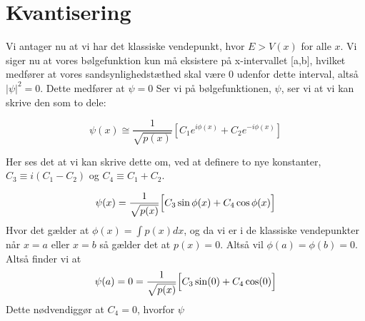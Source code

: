 \section{Kvantisering}
Vi antager nu at vi har det klassiske vendepunkt, hvor $E > V(x) $ for alle $ x$. Vi siger nu at vores bølgefunktion kun må eksistere på x-intervallet [a,b], hvilket medfører at vores sandsynlighedstæthed skal være 0 udenfor dette interval, altså $|\psi|^2 = 0$. Dette medfører at $\psi = 0$
Ser vi på bølgefunktionen, $\psi$, ser vi at vi kan skrive den som to dele:

\begin{equation}
  \psi(x) \cong \frac{1}{\sqrt{p(x)}}\left[C_1e^{i\phi(x)}+C_2e^{-i\phi(x)}\right]
  \label{eq:kvantiseringStart}
\end{equation}

Her ses det at vi kan skrive dette om, ved at definere to nye konstanter, $C_3 \equiv i(C_1-C_2)$ og $C_4 \equiv C_1+C_2$.

\begin{equation}
  \psi(x) = \frac{1}{\sqrt{p(x)}}
  \Bigl[    C_3\sin{\phi(x)}+C_4\cos{\phi(x)}   \Bigr]
  \label{eq:kvantiseringSinCos}
\end{equation}
Hvor det gælder at $\phi(x) = \int p(x) dx$, og da vi er i de klassiske vendepunkter når $ x = a$ eller $x = b$ så gælder det at $p(x) = 0$. Altså vil $\phi(a) = \phi(b) = 0$. Altså finder vi at
\begin{equation}
  \psi(a) = 0 = \frac{1}{\sqrt{p(x)}}\Bigl[C_3\sin(0) + C_4\cos(0)     \Bigr]
  \label{eq:kvantiseringGraense}
\end{equation}
Dette nødvendiggør at $C_4 = 0$, hvorfor $\psi$
